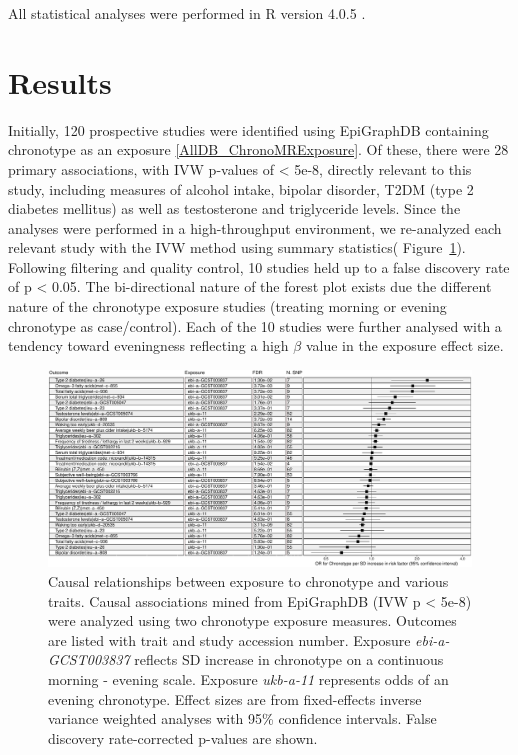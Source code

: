 \documentclass[journal,article,submit,moreauthors,pdftex]{Definitions/mdpi}
\begin{document}
All statistical analyses were performed in R version 4.0.5 \cite{r_core_team_r:_2013}. 



\section{Results}
Initially, 120 prospective studies were identified using EpiGraphDB containing chronotype as an exposure \ref{AllDB_ChronoMRExposure}. Of these, there were 28 primary associations, with IVW p-values of < 5e-8, directly relevant to this study, including measures of alcohol intake, bipolar disorder, T2DM (type 2 diabetes mellitus) as well as testosterone and triglyceride levels. Since the analyses were performed in a high-throughput environment, we re-analyzed each relevant study with the IVW method using summary statistics( Figure~\ref{forestIVW}). Following filtering and quality control, 10 studies held up to a false discovery rate of p < 0.05. The bi-directional nature of the forest plot exists due the different nature of the chronotype exposure studies (treating morning or evening chronotype as case/control). Each of the 10 studies were further analysed with a tendency toward eveningness reflecting a high $\beta$ value in the exposure effect size. 


\begin{figure}[htbp]
	\centering
	\includegraphics[width=\linewidth]{Figs/Analysis1/forestIVW1a.pdf}
	\caption{Causal relationships between exposure to chronotype and various traits. Causal associations mined from EpiGraphDB (IVW p < 5e-8) were analyzed using two chronotype exposure measures. Outcomes are listed with trait and study accession number. Exposure \textit{ebi-a-GCST003837} reflects SD increase in chronotype on a continuous morning - evening scale. Exposure \textit{ukb-a-11} represents odds of an evening chronotype. Effect sizes are from fixed-effects inverse variance weighted analyses with 95\% confidence intervals. False discovery rate-corrected p-values are shown.}
	\label{forestIVW}
\end{figure}
\end{document}
